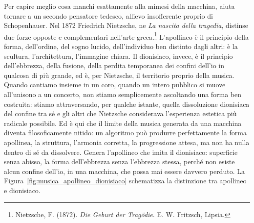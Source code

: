 Per capire meglio cosa manchi esattamente alla mimesi della macchina, aiuta tornare a un secondo pensatore tedesco, allievo insofferente proprio di Schopenhauer. Nel 1872 Friedrich Nietzsche, ne \textit{La nascita della tragedia}, distinse due forze opposte e complementari nell'arte greca.\footnote{Nietzsche, F. (1872). \textit{Die Geburt der Trag\"odie}. E. W. Fritzsch, Lipsia.} L'apollineo \`{e} il principio della forma, dell'ordine, del sogno lucido, dell'individuo ben distinto dagli altri: \`{e} la scultura, l'architettura, l'immagine chiara. Il dionisiaco, invece, \`{e} il principio dell'ebbrezza, della fusione, della perdita temporanea dei confini dell'io in qualcosa di pi\`{u} grande, ed \`{e}, per Nietzsche, il territorio proprio della musica. Quando cantiamo insieme in un coro, quando un intero pubblico si muove all'unisono a un concerto, non stiamo semplicemente ascoltando una forma ben costruita: stiamo attraversando, per qualche istante, quella dissoluzione dionisiaca del confine tra s\'{e} e gli altri che Nietzsche considerava l'esperienza estetica pi\`{u} radicale possibile. Ed \`{e} qui che il limite della musica generata da una macchina diventa filosoficamente nitido: un algoritmo pu\`{o} produrre perfettamente la forma apollinea, la struttura, l'armonia corretta, la progressione attesa, ma non ha nulla dentro di s\'{e} da dissolvere. Genera l'apollineo che imita il dionisiaco: superficie senza abisso, la forma dell'ebbrezza senza l'ebbrezza stessa, perch\'{e} non esiste alcun confine dell'io, in una macchina, che possa mai essere davvero perduto. La Figura~\ref{fig:musica_apollineo_dionisiaco} schematizza la distinzione tra apollineo e dionisiaco.

\begin{center}
	\label{fig:musica_apollineo_dionisiaco}
\end{center}

